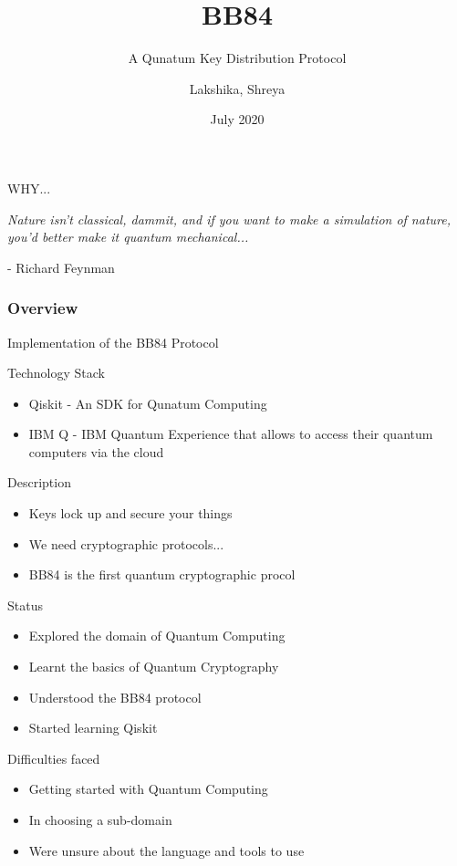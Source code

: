 \documentclass[14 pt]{beamer}
\title[BB84]{BB84}
\subtitle{A Qunatum Key Distribution Protocol}
\author[Team 37]{Lakshika, Shreya}
\date{July 2020}
\begin{document}
\begin{frame}
	\titlepage
\end{frame}

\begin{frame}{WHY...}
    \begin{center}
        \emph{Nature isn’t classical, dammit,
and if you want to make a simulation of nature, you’d better make it quantum mechanical...}
    \end{center}
    \begin{flushright}
        - Richard Feynman
    \end{flushright}
\end{frame}


\begin{frame}
	\frametitle{Overview}
	 Implementation of the BB84 Protocol
\end{frame}

\begin{frame}{Technology Stack}
	\begin{itemize}
		\item Qiskit - An SDK for Qunatum Computing
		\item IBM Q - IBM Quantum Experience that allows to access their quantum computers via the cloud
	\end{itemize}
\end{frame}

\begin{frame}{Description}
    \begin{itemize}[<+->] 
        \item Keys lock up and secure your things
        \item We need cryptographic protocols...
        \item BB84 is the first quantum cryptographic procol
    \end{itemize}
\end{frame}

\begin{frame}{Status}
	\begin{itemize}
		\item Explored the domain of Quantum Computing
        \item Learnt the basics of Quantum Cryptography
        \item Understood the BB84 protocol
        \item Started learning Qiskit
	\end{itemize}
\end{frame}

\begin{frame}{Difficulties faced}
	\begin{itemize}
		\item Getting started with Quantum Computing
        \item In choosing a sub-domain
        \item Were unsure about the language and tools to use
	\end{itemize}
\end{frame}
		
\end{document}
